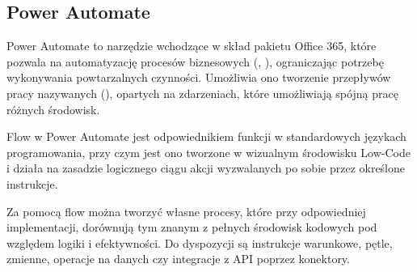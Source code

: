 \subsection{Power Automate}

Power Automate to narzędzie wchodzące w skład pakietu Office 365, które pozwala na automatyzację procesów biznesowych (, ), ograniczając potrzebę wykonywania powtarzalnych czynności. Umożliwia ono tworzenie przepływów pracy nazywanych  (), opartych na zdarzeniach, które umożliwiają spójną pracę różnych środowisk.

Flow w Power Automate jest odpowiednikiem funkcji w standardowych językach programowania, przy czym jest ono tworzone w wizualnym środowisku Low-Code i działa na zasadzie logicznego ciągu akcji wyzwalanych po sobie przez określone instrukcje.

Za pomocą flow można tworzyć własne procesy, które przy odpowiedniej implementacji, dorównują tym znanym z pełnych środowisk kodowych pod względem logiki i efektywności. Do dyspozycji są instrukcje warunkowe, pętle, zmienne, operacje na danych czy integracje z API poprzez konektory.
